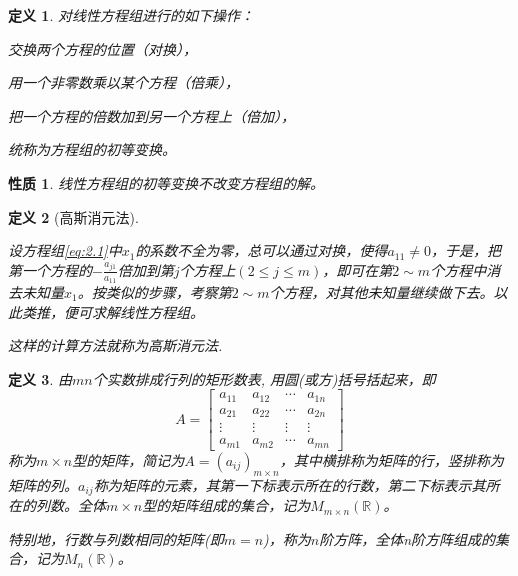 \documentclass[a4paper]{book}
\newtheorem{prop}{性质}[chapter]
\newtheorem{Def}{定义}[chapter]
\newcommand{\enum}{\begin{list}{}{\setlength{\leftmargin}{0pt} \setlength{\itemindent}{2.5em} \setlength{\listparindent}{2em}}}
\begin{document}
\begin{Def}
对线性方程组进行的如下操作：
\enum
\item[(1)] 交换两个方程的位置（对换），
\item[(2)] 用一个非零数乘以某个方程（倍乘），
\item[(3)] 把一个方程的倍数加到另一个方程上（倍加），
\end{list}
统称为方程组的初等变换。
\end{Def}

\begin{prop}
线性方程组的初等变换不改变方程组的解。
\end{prop}

\begin{Def}[高斯消元法]\

设方程组\eqref{eq:2.1}中$x_1$的系数不全为零，总可以通过对换，使得$a_{11}\neq0$，于是，把第一个方程的$-\frac{a_{j1}}{a_{11}}$倍加到第$j$个方程上$(2 \leqslant j \leqslant m)$，即可在第$2\sim m$个方程中消去未知量$x_1$。按类似的步骤，考察第$2\sim m$个方程，对其他未知量继续做下去。以此类推，便可求解线性方程组。

这样的计算方法就称为高斯消元法.

\end{Def}

\begin{Def}
由$mn$个实数排成行列的矩形数表, 用圆(或方)括号括起来，即
$$A = \begin{bmatrix}
a_{11} & a_{12} & \cdots & a_{1n} \\ a_{21} & a_{22} & \cdots & a_{2n} \\ \vdots & \vdots & \vdots & \vdots \\ a_{m1} & a_{m2} & \cdots & a_{mn}
\end{bmatrix}$$
称为$m\times n$型的矩阵，简记为$A = (a_{ij})_{m\times n}$，其中横排称为矩阵的行，竖排称为矩阵的列。$a_{ij}$称为矩阵的元素，其第一下标表示所在的行数，第二下标表示其所在的列数。全体$m\times n$型的矩阵组成的集合，记为$M_{m\times n}(\mathbb{R})$。

特别地，行数与列数相同的矩阵(即$m = n$)，称为$n$阶方阵，全体n阶方阵组成的集合，记为$M_n(\mathbb{R})$。
\end{Def}
\end{document}

